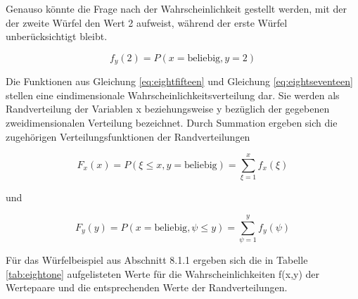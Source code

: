 \noindent Genauso k\"{o}nnte die Frage nach der Wahrscheinlichkeit gestellt werden, mit der der zweite W\"{u}rfel den Wert 2 aufweist, w\"{a}hrend der erste W\"{u}rfel unber\"{u}cksichtigt bleibt.

\begin{equation}\label{eq:eightseventeen}
f_{y} (2)=P(x=\text{beliebig},y=2) 
\end{equation}

\noindent Die Funktionen aus Gleichung \eqref{eq:eightfifteen} und Gleichung \eqref{eq:eightseventeen} stellen eine eindimensionale Wahrscheinlichkeitsverteilung dar. Sie werden als Randverteilung der Variablen x beziehungsweise y bez\"{u}glich der gegebenen zweidimensionalen Verteilung bezeichnet. Durch Summation ergeben sich die zugeh\"{o}rigen Verteilungsfunktionen der Randverteilungen

\begin{equation}\label{eq:eighteighteen}
F_{x}(x)=P(\xi \le x,y=\text{beliebig})=\sum _{\xi=1}^{x}f_{x} (\xi )
\end{equation}

\noindent und

\begin{equation}\label{eq:eightnineteen}
F_{y} (y)=P(x=\text{beliebig},\psi \le y)=\sum _{\psi =1}^{y}f_{y} (\psi)
\end{equation}

\noindent F\"{u}r das W\"{u}rfelbeispiel aus Abschnitt 8.1.1 ergeben sich die in Tabelle \ref{tab:eightone} aufgelisteten Werte f\"{u}r die Wahrscheinlichkeiten f(x,y) der Wertepaare und die entsprechenden Werte der Randverteilungen.

